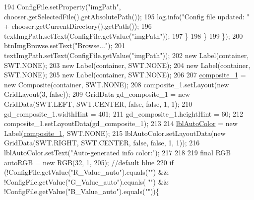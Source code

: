 \begin{DoxyCode}
194                     ConfigFile.setProperty(\textcolor{stringliteral}{"imgPath"}, chooser.getSelectedFile().getAbsolutePath());
195                     log.info(\textcolor{stringliteral}{"Config file updated: "} + chooser.getCurrentDirectory().getPath());
196                     textImgPath.setText(ConfigFile.getValue(\textcolor{stringliteral}{"imgPath"}));
197                 \}
198             \}
199         \});
200         btnImgBrowse.setText(\textcolor{stringliteral}{"Browse..."});
201         textImgPath.setText(ConfigFile.getValue(\textcolor{stringliteral}{"imgPath"}));
202         \textcolor{keyword}{new} Label(container, SWT.NONE);
203         \textcolor{keyword}{new} Label(container, SWT.NONE);
204         \textcolor{keyword}{new} Label(container, SWT.NONE);
205         \textcolor{keyword}{new} Label(container, SWT.NONE);
206         
207         \hyperlink{classit_1_1isislab_1_1masonhelperdocumentation_1_1mason_1_1wizards_1_1_b___project_information_page_ad2438c6d59f23f0717a1503f4e823bb8}{composite\_1} = \textcolor{keyword}{new} Composite(container, SWT.NONE);
208         composite\_1.setLayout(\textcolor{keyword}{new} GridLayout(3, \textcolor{keyword}{false}));
209         GridData gd\_composite\_1 = \textcolor{keyword}{new} GridData(SWT.LEFT, SWT.CENTER, \textcolor{keyword}{false}, \textcolor{keyword}{false}, 1, 1);
210         gd\_composite\_1.widthHint = 401;
211         gd\_composite\_1.heightHint = 60;
212         composite\_1.setLayoutData(gd\_composite\_1);
213         
214         \hyperlink{classit_1_1isislab_1_1masonhelperdocumentation_1_1mason_1_1wizards_1_1_b___project_information_page_a2f300a11970751b92cd1f06b864da746}{lblAutoColor} = \textcolor{keyword}{new} Label(\hyperlink{classit_1_1isislab_1_1masonhelperdocumentation_1_1mason_1_1wizards_1_1_b___project_information_page_ad2438c6d59f23f0717a1503f4e823bb8}{composite\_1}, SWT.NONE);
215         lblAutoColor.setLayoutData(\textcolor{keyword}{new} GridData(SWT.RIGHT, SWT.CENTER, \textcolor{keyword}{false}, \textcolor{keyword}{false}, 1, 1));
216         lblAutoColor.setText(\textcolor{stringliteral}{"Auto-generated info color:"});
217 
218         
219         \textcolor{keyword}{final} RGB autoRGB = \textcolor{keyword}{new} RGB(32, 1, 205);    \textcolor{comment}{//default blue}
220         \textcolor{keywordflow}{if} (!ConfigFile.getValue(\textcolor{stringliteral}{"R\_Value\_auto"}).equals(\textcolor{stringliteral}{""}) && !ConfigFile.getValue(\textcolor{stringliteral}{"G\_Value\_auto"}).equals(\textcolor{stringliteral}{
      ""}) && !ConfigFile.getValue(\textcolor{stringliteral}{"B\_Value\_auto"}).equals(\textcolor{stringliteral}{""}))\{

\end{DoxyCode}
